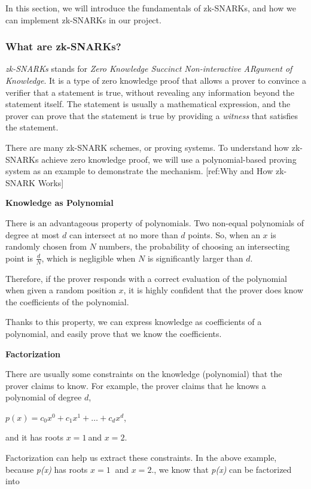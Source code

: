 \documentclass[
]{report}
\begin{document}
In this section, we will introduce the fundamentals of zk-SNARKs, and
how we can implement zk-SNARKs in our project.

\subsubsection{What are zk-SNARKs?}

\emph{zk-SNARKs} stands for \emph{Zero Knowledge Succinct
Non-interactive ARgument of Knowledge}. It is a type of zero knowledge
proof that allows a prover to convince a verifier that a statement is
true, without revealing any information beyond the statement itself. The
statement is usually a mathematical expression, and the prover can prove
that the statement is true by providing a \emph{witness} that satisfies
the statement.

There are many zk-SNARK schemes, or proving systems. To understand how
zk-SNARKs achieve zero knowledge proof, we will use a polynomial-based
proving system as an example to demonstrate the mechanism.
{[}ref:Why and How zk-SNARK Works{]}

\textbf{Knowledge as Polynomial}

There is an advantageous property of polynomials. Two non-equal
polynomials of degree at most \(d\) can intersect at no more than \(d\)
points. So, when an \(x\) is randomly chosen from \(N\) numbers, the
probability of choosing an intersecting point is \(\frac{d}{N}\), which
is negligible when \(N\) is significantly larger than \(d\).

Therefore, if the prover responds with a correct evaluation of the
polynomial when given a random position \(x\), it is highly confident
that the prover does know the coefficients of the polynomial.

Thanks to this property, we can express knowledge as coefficients of a
polynomial, and easily prove that we know the coefficients.

\textbf{Factorization}

There are usually some constraints on the knowledge (polynomial) that
the prover claims to know. For example, the prover claims that he knows
a polynomial of degree \(d\),

\(p(x) = c_{0}x^{0} + c_{1}x^{1} + \ldots + c_{d}x^{d}\),

and it has roots \(x = 1\ \)and \(x = 2\).

Factorization can help us extract these constraints. In the above
example, because \emph{p(x)} has roots \(x = 1\ \) and \(x = 2\)., we
know that \emph{p(x)} can be factorized into
\end{document}
